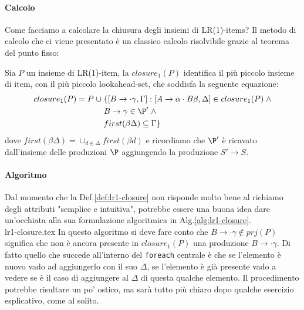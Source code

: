 \documentclass[class=book, crop=false, oneside, 12pt]{standalone}
\begin{document}
\paragraph{Calcolo}
Come facciamo a calcolare la chiusura degli insiemi di LR(1)-items? Il metodo di calcolo che ci viene presentato è un classico calcolo risolvibile grazie al teorema del punto fisso:
\begin{definition}
    \label{def:lr1-closure}
    Sia \(P\) un insieme di LR(1)-item, la \(closure_1(P)\) identifica il più piccolo insieme di item, con il più piccolo lookahead-set, che soddisfa la seguente equazione:
    \begin{align*}
        closure_1(P) = P \; \cup \; &\{[B \rightarrow \cdot \gamma, \Gamma] : [A \rightarrow \alpha \cdot B \beta, \Delta] \in closure_1(P) \; \land \\ 
        & B \rightarrow \gamma \in \P' \; \land \\
        & first(\beta \Delta) \subseteq \Gamma\}
    \end{align*}  
    dove \(first(\beta \Delta) = \cup_{d \in \Delta} first(\beta d)\) e ricordiamo che \(\P'\) è ricavato dall'insieme delle produzioni \(\P\) aggiungendo la produzione \(S' \to S\).
\end{definition}
\paragraph{Algoritmo}
Dal momento che la Def.\ref{def:lr1-closure} non risponde molto bene al richiamo degli attributi "semplice e intuitiva", potrebbe essere una buona idea dare un'occhiata alla sua formulazione algoritmica in Alg.\ref{alg:lr1-closure}. \\
{lr1-closure.tex}
In questo algoritmo si deve fare conto che \(B \to \cdot \gamma \notin prj(P)\) significa che non è ancora presente in \(closure_1(P)\) una produzione \(B \to \cdot \gamma\).
Di fatto quello che succede all'interno del \texttt{foreach} centrale è che se l'elemento è nuovo vado ad aggiungerlo con il suo \(\Delta\), se l'elemento è già presente vado a vedere se è il caso di aggiungere al \(\Delta\) di questa qualche elemento. Il procedimento potrebbe risultare un po' ostico, ma sarà tutto più chiaro dopo qualche esercizio esplicativo, come al solito.
\end{document}
